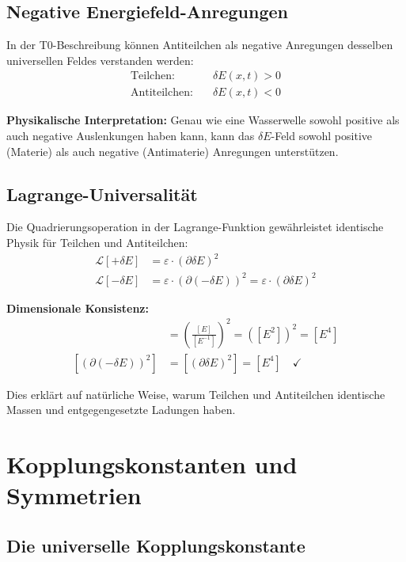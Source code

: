 \documentclass[12pt,a4paper]{report}
\begin{document}
	\subsection{Negative Energiefeld-Anregungen}
	
	In der T0-Beschreibung können Antiteilchen als negative Anregungen desselben universellen Feldes verstanden werden:
	\begin{align}
		\text{Teilchen:} \quad &\delta E(x,t) > 0 \\
		\text{Antiteilchen:} \quad &\delta E(x,t) < 0
	\end{align}
	
	\textbf{Physikalische Interpretation:} Genau wie eine Wasserwelle sowohl positive als auch negative Auslenkungen haben kann, kann das $\delta E$-Feld sowohl positive (Materie) als auch negative (Antimaterie) Anregungen unterstützen.
	
	\subsection{Lagrange-Universalität}
	
	Die Quadrierungsoperation in der Lagrange-Funktion gewährleistet identische Physik für Teilchen und Antiteilchen:
	\begin{align}
		\mathcal{L}[+\delta E] &= \varepsilon \cdot (\partial \delta E)^2 \\
		\mathcal{L}[-\delta E] &= \varepsilon \cdot (\partial(-\delta E))^2 = \varepsilon \cdot (\partial \delta E)^2
	\end{align}
	
	\textbf{Dimensionale Konsistenz:}
	\begin{align}
		[(\partial \delta E)^2] &= \left(\frac{[E]}{[E^{-1}]}\right)^2 = ([E^2])^2 = [E^4] \\
		[(\partial(-\delta E))^2] &= [(\partial \delta E)^2] = [E^4] \quad \checkmark
	\end{align}
	
	Dies erklärt auf natürliche Weise, warum Teilchen und Antiteilchen identische Massen und entgegengesetzte Ladungen haben.
	
	\section{Kopplungskonstanten und Symmetrien}
	
	\subsection{Die universelle Kopplungskonstante}
	
\end{document}
